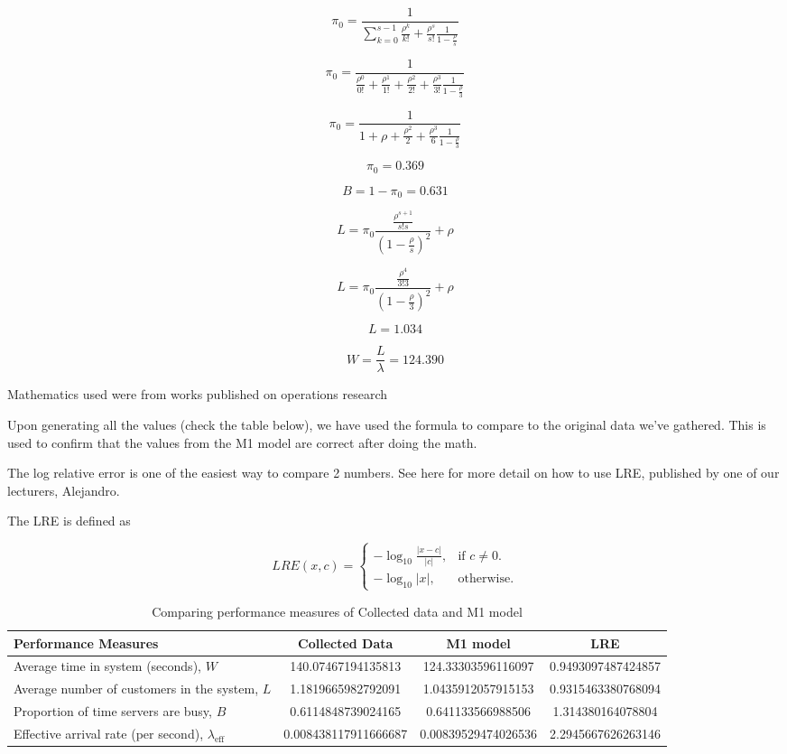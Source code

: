 \documentclass{article}
\begin{document}
$$
\pi_{0} = \frac{1}{\sum_{k=0}^{s-1}{\frac{\rho^k}{k!}} + \frac{\rho^s}{s!}\frac{1}{1-\frac{\rho}{s}}}
$$

$$
\pi_{0} = \frac{1}{\frac{\rho^0}{0!} + \frac{\rho^1}{1!} + \frac{\rho^2}{2!} + \frac{\rho^3}{3!}\frac{1}{1-\frac{\rho}{3}}}
$$

$$
\pi_{0} = \frac{1}{1 + \rho + \frac{\rho^2}{2} + \frac{\rho^3}{6}\frac{1}{1-\frac{\rho}{3}}}
$$

$$
\pi_{0} = 0.369
$$

$$
B = 1-\pi_{0} = 0.631
$$

$$
L = \pi_{0}\frac{\frac{\rho^{s+1}}{s!s}}{(1-\frac{\rho}{s})^2}+\rho
$$

$$
L = \pi_{0}\frac{\frac{\rho^{4}}{3!3}}{(1-\frac{\rho}{3})^2}+\rho
$$

$$
L = 1.034
$$

$$
W = \frac{L}{\lambda} = 124.390
$$

Mathematics used were from works published on operations research\cite{hillier1967introduction}\cite{little1961proof}

Upon generating all the values (check the table below), we have used the formula to compare to the original data we’ve gathered. This is used to confirm that the values from the M1 model are correct after doing the math.

The log relative error is one of the easiest way to compare 2 numbers. See here\cite{almiron2010numerical} for more detail on how to use LRE, published by one of our lecturers, Alejandro.

The LRE is defined as 

$$
LRE(x,c)=\begin{cases}
    -\log_{10}{\frac{|x-c|}{|c|}}, & \text{if $c \neq 0$}.\\
    -\log_{10}{|x|}, & \text{otherwise}.
\end{cases}
$$

\begin{table}[H]
    \centering
    \caption{Comparing performance measures of Collected data and M1 model}
    \begin{tabu}{X S S S}
        \toprule
        \textbf{Performance Measures} & \textbf{Collected Data} & \textbf{M1 model}& \textbf{LRE}\\
        \midrule
        Average time in system (seconds), $W$ & 140.07467194135813 & 124.33303596116097 & 0.9493097487424857\\
        Average number of customers in the system, $L$ & 1.1819665982792091 & 1.0435912057915153 & 0.9315463380768094\\
        Proportion of time servers are busy, $B$ & 0.6114848739024165 & 0.641133566988506 & 1.314380164078804\\
        Effective arrival rate (per second), $\lambda_{\text{eff}}$ & 0.008438117911666687 & 0.00839529474026536 & 2.2945667626263146\\
        \bottomrule
    \end{tabu}
    \label{tab:M1}
\end{table}
\end{document}
